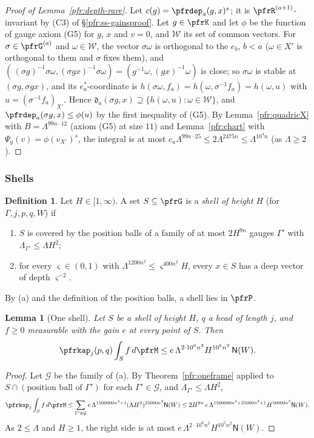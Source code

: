 \documentclass[10pt]{amsart}
\newtheorem{lemma}[theorem]{Lemma}
\theoremstyle{definition}
\newtheorem{definition}[theorem]{Definition}
\theoremstyle{remark}
\begin{document}
\begin{proof}[Proof of Lemma~\ref{pfr:depth-rare}]
Let $c(g)=\pfrdep_a(g,x)^s$; it is $\pfrR^{(a+1)}$-invariant by (C3) of \S\ref{pfr:ss-gainsproof}. Let
$g\in\pfrK$ and let $\phi$ be the function of gauge axiom (G5) for $g$, $x$ and $v=0$, and $\mathcal W$ its set
of common vectors. For $\sigma\in\pfrG^{(a)}$ and $\omega\in\mathcal W$, the vector $\sigma\omega$ is orthogonal to the
$e_b$, $b<a$ ($\omega\in X'$ is orthogonal to them and $\sigma$ fixes them), and $(\,(\sigma g)^{-1}\sigma\omega,
(\sigma gx)^{-1}\sigma\omega)=(g^{-1}\omega,(gx)^{-1}\omega)$ is close; so $\sigma\omega$ is stable at $(\sigma g,\sigma gx)$,
and its $e_a^*$-coordinate is $h(\sigma\omega,f_a)=h(\omega,\sigma^{-1}f_a)=h(\omega,u)$ with $u=(\sigma^{-1}f_a)_{X'}$. Hence
$\mathfrak d_a(\sigma g,x)\supseteq\{h(\omega,u):\omega\in\mathcal W\}$, and $\pfrdep_a(\sigma g,x)\le\phi(u)$ by the first
inequality of (G5). By Lemma~\ref{pfr:quadricX} with $B=\Lambda^{99n\cdot12}$ (axiom (G5) at size $11$) and
Lemma~\ref{pfr:chart} with $\Psi_g(v)=\phi(v_{X'})^s$, the integral is at most
$c_a\Lambda^{99n\cdot25}\le2\Lambda^{2475n}\le\Lambda^{10^4n}$ (as $\Lambda\ge2$).
\end{proof}

\subsubsection*{Shells}
\begin{definition}\label{pfr:shell}
Let $H\in[1,\infty)$. A set $S\subseteq\pfrG$ is a \emph{shell of height $H$} (for $\Gamma,j,p,q,W$)
if
\begin{enumerate}
\item[(a)] $S$ is covered by the position balls of a family of at most $2H^{9n}$ gauges $\Gamma'$ with
$\Lambda_{\Gamma'}\le\Lambda H^2$;
\item[(b)] for every $\varsigma\in(0,1)$ with $\Lambda^{1200n^2}\le\varsigma^{400n^2}H$, every $x\in S$
has a deep vector of depth $\varsigma^{-2}$.
\end{enumerate}
\end{definition}
By (a) and the definition of the position balls, a shell lies in $\pfrP$.

\begin{lemma}[One shell]\label{pfr:oneshell}
Let $S$ be a shell of height $H$, $q$ a head of length $j$, and $f\ge0$ measurable with the gain $e$
at every point of $S$. Then
\[
\pfrkap_j(p,q)\int_Sf\,d\pfrM\le e\,\Lambda^{2\cdot10^6n^3}H^{10^5n^2}\,\mathsf N(W).
\]
\end{lemma}
\begin{proof}
Let $\mathcal G$ be the family of (a). By Theorem~\ref{pfr:oneframe} applied to $S\cap(\text{position
ball of }\Gamma')$ for each $\Gamma'\in\mathcal G$, and $\Lambda_{\Gamma'}\le\Lambda H^2$,
\[
\pfrkap_j\int_{S}f\,d\pfrM\le\sum_{\Gamma'\in\mathcal G}e\,\Lambda^{1500000n^3+1}(\Lambda H^2)^{25000n^2}
\mathsf N(W)\le2H^{9n}\,e\,\Lambda^{1500000n^3+25000n^2+1}H^{50000n^2}\mathsf N(W).
\]
As $2\le\Lambda$ and $H\ge1$, the right side is at most $e\,\Lambda^{2\cdot10^6n^3}H^{10^5n^2}\mathsf N(W)$.
\end{proof}
\end{document}
